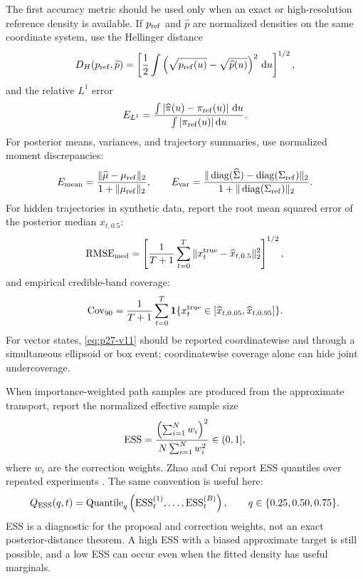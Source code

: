 \documentclass[11pt]{article}
\numberwithin{equation}{section}
\newcommand{\dd}{\,\mathrm d}
\newcommand{\ind}{\mathbf 1}
\newcommand{\diag}{\operatorname{diag}}
\begin{document}
The first accuracy metric should be used only when an exact or high-resolution
reference density is available.  If \(p_{\rm ref}\) and \(\widehat p\) are
normalized densities on the same coordinate system, use the Hellinger distance
\begin{equation}
    D_H(p_{\rm ref},\widehat p)
    =
    \left[
    \frac12
    \int
    \left(
    \sqrt{p_{\rm ref}(u)}
    -
    \sqrt{\widehat p(u)}
    \right)^2
    \dd u
    \right]^{1/2},
    \label{eq:p27-v7}
\end{equation}
and the relative \(L^1\) error
\begin{equation}
    E_{L^1}
    =
    \frac{
    \int
    \left|
    \widehat\pi(u)-\pi_{\rm ref}(u)
    \right|\dd u}
    {\int |\pi_{\rm ref}(u)|\dd u}.
    \label{eq:p27-v8}
\end{equation}
For posterior means, variances, and trajectory summaries, use normalized
moment discrepancies:
\begin{equation}
    E_{\rm mean}
    =
    \frac{
    \|\widehat\mu-\mu_{\rm ref}\|_2}
    {1+\|\mu_{\rm ref}\|_2},
    \qquad
    E_{\rm var}
    =
    \frac{
    \|\diag(\widehat\Sigma)-\diag(\Sigma_{\rm ref})\|_2}
    {1+\|\diag(\Sigma_{\rm ref})\|_2}.
    \label{eq:p27-v9}
\end{equation}
For hidden trajectories in synthetic data, report the root mean squared error
of the posterior median \(\widehat x_{t,0.5}\):
\begin{equation}
    {\rm RMSE}_{\rm med}
    =
    \left[
    \frac1{T+1}
    \sum_{t=0}^T
    \|x_t^{\rm true}-\widehat x_{t,0.5}\|_2^2
    \right]^{1/2},
    \label{eq:p27-v10}
\end{equation}
and empirical credible-band coverage:
\begin{equation}
    {\rm Cov}_{90}
    =
    \frac1{T+1}
    \sum_{t=0}^T
    \ind\{
    x_t^{\rm true}\in
    [\widehat x_{t,0.05},\widehat x_{t,0.95}]
    \}.
    \label{eq:p27-v11}
\end{equation}
For vector states, \eqref{eq:p27-v11} should be reported coordinatewise and
through a simultaneous ellipsoid or box event; coordinatewise coverage alone
can hide joint undercoverage.

When importance-weighted path samples are produced from the approximate
transport, report the normalized effective sample size
\begin{equation}
    {\rm ESS}
    =
    \frac{\left(\sum_{i=1}^N w_i\right)^2}
    {N\sum_{i=1}^N w_i^2}
    \in(0,1],
    \label{eq:p27-v12}
\end{equation}
where \(w_i\) are the correction weights.  Zhao and Cui report ESS quantiles
over repeated experiments \cite{zhao2024ttsequential}.  The same convention is
useful here:
\begin{equation}
    Q_{\rm ESS}(q,t)
    =
    \operatorname{Quantile}_{q}
    \left(
    {\rm ESS}^{(1)}_t,\ldots,{\rm ESS}^{(B)}_t
    \right),
    \qquad
    q\in\{0.25,0.50,0.75\}.
    \label{eq:p27-v13}
\end{equation}
ESS is a diagnostic for the proposal and correction weights, not an exact
posterior-distance theorem.  A high ESS with a biased approximate target is
still possible, and a low ESS can occur even when the fitted density has useful
marginals.
\end{document}
